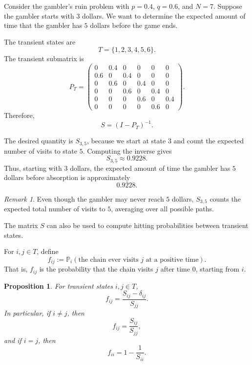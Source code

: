 \documentclass[11pt]{article}
\theoremstyle{plain}
\newtheorem{proposition}[theorem]{Proposition}
\theoremstyle{definition}
\theoremstyle{remark}
\newtheorem{remark}[theorem]{Remark}
\begin{document}
	
	
	
	
	Consider the gambler's ruin problem with \(p=0.4\), \(q=0.6\), and \(N=7\). Suppose the gambler starts with \(3\) dollars. We want to determine the expected amount of time that the gambler has \(5\) dollars before the game ends.
	
	The transient states are
	\[
	T=\{1,2,3,4,5,6\}.
	\]
	The transient submatrix is
	\[
	P_T=
	\begin{pmatrix}
		0   & 0.4 & 0   & 0   & 0   & 0\\
		0.6 & 0   & 0.4 & 0   & 0   & 0\\
		0   & 0.6 & 0   & 0.4 & 0   & 0\\
		0   & 0   & 0.6 & 0   & 0.4 & 0\\
		0   & 0   & 0   & 0.6 & 0   & 0.4\\
		0   & 0   & 0   & 0   & 0.6 & 0
	\end{pmatrix}.
	\]
	Therefore,
	\[
	S=(I-P_T)^{-1}.
	\]
	
	The desired quantity is \(S_{3,5}\), because we start at state \(3\) and count the expected number of visits to state \(5\). Computing the inverse gives
	\[
	S_{3,5}\approx 0.9228.
	\]
	Thus, starting with \(3\) dollars, the expected amount of time the gambler has \(5\) dollars before absorption is approximately
	\[
	0.9228.
	\]
	
	\begin{remark}
		Even though the gambler may never reach \(5\) dollars, \(S_{3,5}\) counts the expected total number of visits to \(5\), averaging over all possible paths.
	\end{remark}
	
	
	

	
	The matrix \(S\) can also be used to compute hitting probabilities between transient states.
	
	For \(i,j\in T\), define
	\[
	f_{ij}:=\mathbb{P}_i(\text{the chain ever visits }j\text{ at a positive time}).
	\]
	That is, \(f_{ij}\) is the probability that the chain visits \(j\) after time \(0\), starting from \(i\).
	
	\begin{proposition}
		For transient states \(i,j\in T\),
		\[
		f_{ij}=\frac{S_{ij}-\delta_{ij}}{S_{jj}}.
		\]
		In particular, if \(i\neq j\), then
		\[
		f_{ij}=\frac{S_{ij}}{S_{jj}},
		\]
		and if \(i=j\), then
		\[
		f_{ii}=1-\frac{1}{S_{ii}}.
		\]
	\end{proposition}
	
\end{document}
